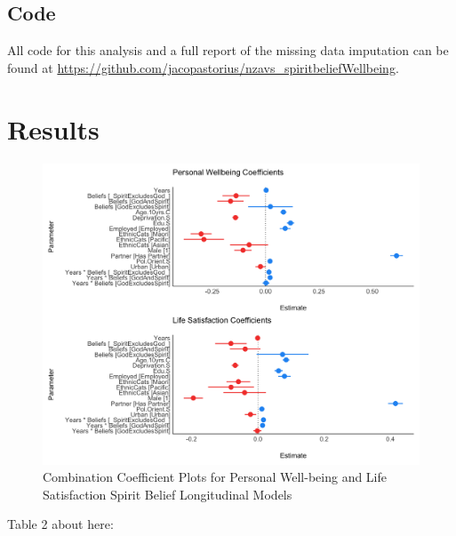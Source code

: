 \documentclass[
  english,
  man]{apa6}
\begin{document}
\hypertarget{code}{%
\subsection{Code}\label{code}}

All code for this analysis and a full report of the missing data imputation can be found at \url{https://github.com/jacopastorius/nzavs_spiritbeliefWellbeing}.

\hypertarget{results}{%
\section{Results}\label{results}}

\begin{figure}
\includegraphics[width=6.4in]{Figs/USE_2_coefficientplots-1} \caption{Combination Coefficient Plots for Personal Well-being and Life Satisfaction Spirit Belief Longitudinal Models}\label{fig:unnamed-chunk-1}
\end{figure}

Table 2 about here:
\end{document}
